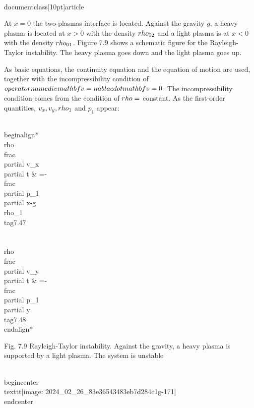 \\documentclass[10pt]{article}
\begin{document}
{{{{At $x=0$ the two-plasmas interface is located. Against the gravity $g$, a heavy plasma is located at $x>0$ with the density $\\rho_{02}$ and a light plasma is at $x<0$ with the density $\\rho_{01}$. Figure 7.9 shows a schematic figure for the Rayleigh-Taylor instability. The heavy plasma goes down and the light plasma goes up.

As basic equations, the continuity equation and the equation of motion are used, together with the incompressibility condition of $\\operatorname{div} \\mathbf{v}=\\nabla \\cdot \\mathbf{v}=0$. The incompressibility condition comes from the condition of $\\rho=$ constant. As the first-order quantities, $v_{x}, v_{y}, \\rho_{1}$ and $p_{1}$ appear:


\\begin{align*}
\\rho \\frac{\\partial v_{x}}{\\partial t} & =-\\frac{\\partial p_{1}}{\\partial x}-g \\rho_{1}  \\tag{7.47}\\\\
\\rho \\frac{\\partial v_{y}}{\\partial t} & =-\\frac{\\partial p_{1}}{\\partial y} \\tag{7.48}
\\end{align*}


Fig. 7.9 Rayleigh-Taylor instability. Against the gravity, a heavy plasma is supported by a light plasma. The system is unstable

\\begin{center}
\\texttt{[image: 2024\_02\_26\_83e36543483eb7d284c1g-171]}
\\end{center}


}}}}
\end{document}
